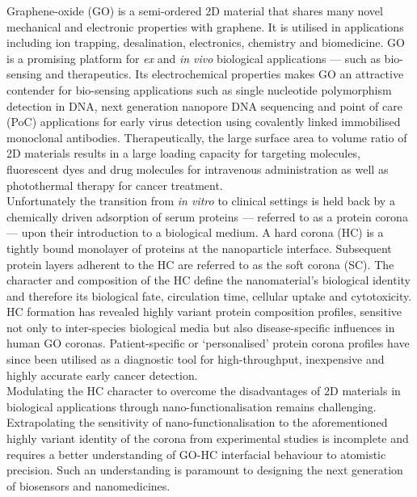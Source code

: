 Graphene-oxide (GO) is a semi-ordered 2D material that shares many novel mechanical and electronic properties with graphene. It is utilised in applications including ion trapping, desalination, electronics, chemistry and biomedicine.\cite{yuan2017enhanced, zhu2010graphene, chung2013biomedical} GO is a promising platform for \textit{ex} and \textit{in vivo} biological applications --- such as bio-sensing and therapeutics. Its electrochemical properties makes GO an attractive contender for bio-sensing applications such as single nucleotide polymorphism detection in DNA,\cite{bonanni2012inherently} next generation nanopore DNA sequencing \cite{heerema2016graphene} and point of care (PoC) applications for early virus detection using covalently linked immobilised monoclonal antibodies.\cite{afsahi2018novel} Therapeutically, the large surface area to volume ratio of 2D materials results in a large loading capacity for targeting molecules, fluorescent dyes and drug molecules for intravenous administration as well as photothermal therapy for cancer treatment.\cite{robinson2011ultrasmall, liu2013graphene, sun2008nano, zhang2010functional}  \\

Unfortunately the transition from \textit{in vitro} to clinical settings is held back by a chemically driven adsorption of serum proteins --- referred to as a protein corona --- upon their introduction to a biological medium.\cite{casals2010time, ke2017decade} A hard corona (HC) is a tightly bound monolayer of proteins at the nanoparticle interface. Subsequent protein layers adherent to the HC are referred to as the soft corona (SC).\cite{rocker2009quantitative} The character and composition of the HC define the nanomaterial's biological identity and therefore its biological fate, circulation time, cellular uptake and cytotoxicity.\cite{nierenberg2018formation, mei2018protein} HC formation has revealed highly variant protein composition profiles, sensitive not only to inter-species biological media \cite{solorio2017comparison} but also disease-specific influences in human GO coronas.\cite{hajipour2015personalized} Patient-specific or `personalised' protein corona profiles have since been utilised as a diagnostic tool for high-throughput, inexpensive and highly accurate early cancer detection.\cite{papi2019converting} \\

Modulating the HC character to overcome the disadvantages of 2D materials in biological applications through nano-functionalisation remains challenging.\cite{rampado2020recent} Extrapolating the sensitivity of nano-functionalisation to the aforementioned highly variant identity of the corona from experimental studies is incomplete and requires a better understanding of GO-HC interfacial behaviour to atomistic precision. Such an understanding is paramount to designing the next generation of biosensors and nanomedicines.\\


